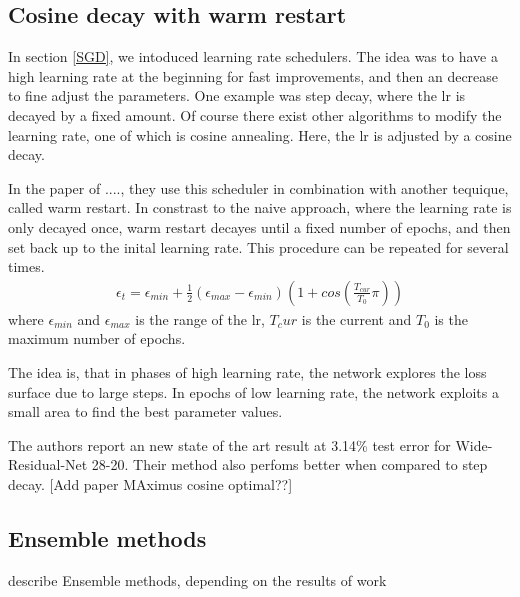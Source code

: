 \subsection{Cosine decay with warm restart}\label{cosine_decay}
In section \ref{SGD}, we intoduced learning rate schedulers. The idea was to
have a high learning rate at the beginning for fast improvements, and then an
decrease to fine adjust the parameters. One example was step decay, where the lr
is decayed by a fixed amount. Of course there exist other algorithms to modify
the learning rate, one of which is cosine annealing. Here, the lr is adjusted by
a cosine decay.

In the paper of ...., they use this scheduler in combination with another
tequique, called warm restart. In constrast to the naive approach, where the
learning rate is only decayed once, warm restart decayes until a fixed number of
epochs, and then set back up to the inital learning rate. This procedure can be
repeated for several times. 
\begin{align}
    \epsilon_t = \epsilon_{min} + \frac{1}{2} (\epsilon_{max} - \epsilon_{min})(1+cos(\frac{T_{cur}}{T_0}\pi))
\end{align}
where $\epsilon_{min}$ and $\epsilon_{max}$ is the range of the lr, $T_cur$ is
the current and $T_0$ is the maximum number of epochs.

The idea is, that in phases of high learning rate, the network explores the loss
surface due to large steps. In epochs of low learning rate, the network exploits
a small area to find the best parameter values. 

The authors report an new state of the art result at 3.14\% test error for
Wide-Residual-Net 28-20. Their method also perfoms better when compared to step
decay. [Add paper MAximus cosine optimal??]
\subsection{Ensemble methods}
describe Ensemble methods, depending on the results of work










